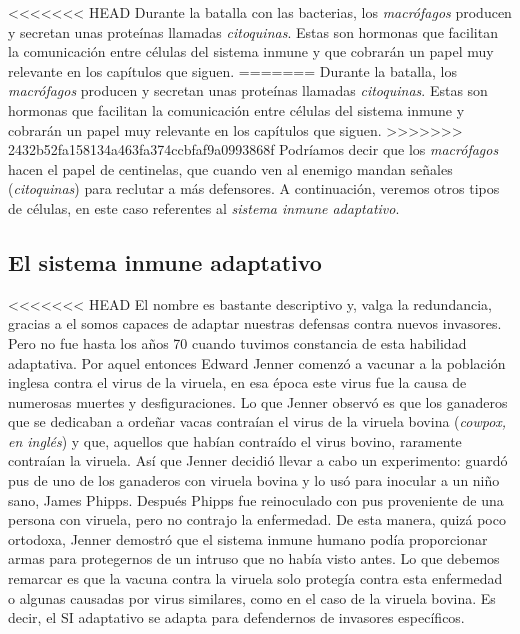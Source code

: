 <<<<<<< HEAD
Durante la batalla con las bacterias, los \textit{macrófagos} producen y secretan unas proteínas llamadas \textit{citoquinas}.
Estas son hormonas que facilitan la comunicación entre células del sistema inmune y que cobrarán un papel muy relevante en los capítulos que siguen.
=======
Durante la batalla, los \textit{macrófagos} producen y secretan unas proteínas llamadas \textit{citoquinas}.
Estas son hormonas que facilitan la comunicación entre células del sistema inmune y cobrarán un papel muy relevante en los capítulos que siguen.
>>>>>>> 2432b52fa158134a463fa374ccbfaf9a0993868f
Podríamos decir que los \textit{macrófagos} hacen el papel de centinelas, que cuando ven al enemigo mandan señales (\textit{citoquinas}) para reclutar a más defensores. A continuación, veremos otros tipos de células, en este caso referentes al \textit{sistema inmune adaptativo}.

\subsection{El sistema inmune adaptativo}

<<<<<<< HEAD
El nombre es bastante descriptivo y, valga la redundancia, gracias a el somos capaces de adaptar nuestras defensas contra nuevos invasores. Pero no fue hasta los años 70 cuando tuvimos constancia de esta habilidad adaptativa. Por aquel entonces Edward Jenner comenzó a vacunar a la población inglesa contra el virus de la viruela, en esa época este virus fue la causa de numerosas muertes y desfiguraciones. Lo que Jenner observó es que los ganaderos que se dedicaban a ordeñar vacas contraían el virus de la viruela bovina (\textit{cowpox, en inglés}) y que, aquellos  que habían contraído el virus bovino, raramente contraían la viruela. Así que Jenner decidió llevar a cabo un experimento: guardó pus de uno de los ganaderos con viruela bovina y lo usó para inocular a un niño sano, James Phipps. Después Phipps fue reinoculado con pus proveniente de una persona con viruela, pero no contrajo la enfermedad. De esta manera, quizá poco ortodoxa, Jenner demostró que el sistema inmune humano podía proporcionar armas para protegernos de un intruso que no había visto antes. Lo que debemos remarcar es que la vacuna contra la viruela solo protegía contra esta enfermedad o algunas causadas por virus similares, como en el caso de la viruela bovina. Es decir, el SI adaptativo se adapta para defendernos de invasores específicos. 


